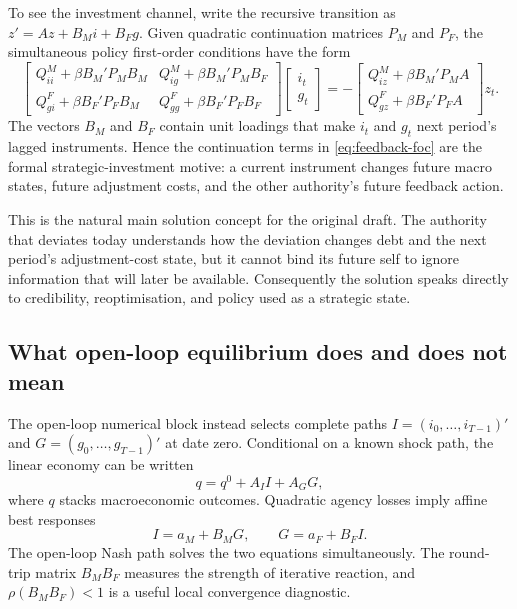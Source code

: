 \documentclass[11pt]{article}
\begin{document}
To see the investment channel, write the recursive transition as
$z'=Az+B_Mi+B_Fg$.  Given quadratic continuation matrices $P_M$ and $P_F$, the
simultaneous policy first-order conditions have the form
\begin{equation}
 \begin{bmatrix}
  Q^M_{ii}+\beta B_M'P_MB_M & Q^M_{ig}+\beta B_M'P_MB_F\\
  Q^F_{gi}+\beta B_F'P_FB_M & Q^F_{gg}+\beta B_F'P_FB_F
 \end{bmatrix}
 \begin{bmatrix}i_t\\g_t\end{bmatrix}
 =-
 \begin{bmatrix}
  Q^M_{iz}+\beta B_M'P_MA\\
  Q^F_{gz}+\beta B_F'P_FA
 \end{bmatrix}z_t .                                             \label{eq:feedback-foc}
\end{equation}
The vectors $B_M$ and $B_F$ contain unit loadings that make $i_t$ and $g_t$
next period's lagged instruments.  Hence the continuation terms in
\eqref{eq:feedback-foc} are the formal strategic-investment motive: a current
instrument changes future macro states, future adjustment costs, and the other
authority's future feedback action.

This is the natural main solution concept for the original draft.  The
authority that deviates today understands how the deviation changes debt and
the next period's adjustment-cost state, but it cannot bind its future self to
ignore information that will later be available.  Consequently the solution
speaks directly to credibility, reoptimisation, and policy used as a strategic
state.

\subsection{What open-loop equilibrium does and does not mean}

The open-loop numerical block instead selects complete paths
$I=(i_0,\ldots,i_{T-1})'$ and $G=(g_0,\ldots,g_{T-1})'$ at date zero.  Conditional
on a known shock path, the linear economy can be written
\begin{equation}
 q=q^0+A_I I+A_GG,                                               \label{eq:pathmap}
\end{equation}
where $q$ stacks macroeconomic outcomes.  Quadratic agency losses imply affine
best responses
\begin{equation}
 I=a_M+B_MG,\qquad G=a_F+B_FI.                                  \label{eq:br}
\end{equation}
The open-loop Nash path solves the two equations simultaneously.  The
round-trip matrix $B_MB_F$ measures the strength of iterative reaction, and
$\rho(B_MB_F)<1$ is a useful local convergence diagnostic.
\end{document}
